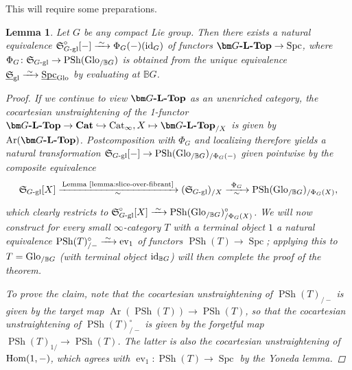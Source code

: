 \documentclass[reqno]{memo-l}
\theoremstyle{mythm}
\newtheorem{lemma}[thm]{Lemma}
\theoremstyle{definition}
\numberwithin{equation}{section}
\newcommand{\gl}{\textup{gl}}
\DeclareMathOperator{\ev}{ev}
\DeclareMathOperator{\Spc}{Spc}
\DeclareMathOperator{\Cat}{Cat}
\renewcommand{\hom}{\textup{hom}}
\DeclareMathOperator{\PSh}{PSh}
\DeclareMathOperator{\Ar}{Ar}
\newcommand{\cat}[1]{\textbf{\textup{#1}}}
\renewcommand{\hom}{{\textup{Hom}}}
\newcommand{\id}{\textup{id}}
\newcommand{\Glo}{\textup{Glo}}
\newcommand{\BGcat}[1]{\mathbb B{#1}}
\newcommand{\ulhelper}[2]{\underline{\setbox0=\hbox{$#1#2$}\dp0=0.4pt \box0\relax}}
\newcommand{\ul}[1]{{\mathpalette\ulhelper{#1}}\hbox{\rule[-2pt]{0pt}{0pt}}}
\newcommand{\iso}{\xrightarrow{\;\smash{\raisebox{-0.25ex}{\ensuremath{\scriptstyle\sim}}}\;}}
\newcommand{\myS}{{{\mathfrak S\kern-.4pt}}}
\begin{document}
This will require some preparations.

\begin{lemma}
    Let $G$ be any compact Lie group. Then there exists a natural equivalence $\myS_\textup{$G$-gl}^{\circ}[-]\iso\Phi_G(-)(\id_G)$ of functors $\cat{$\bm G$-$\cat{L}$-Top}\to\Spc$, where $\Phi_G\colon\myS_\textup{$G$-gl}\to\PSh(\Glo_{/\BGcat{G}})$ is obtained from the unique equivalence $\ul\myS_\gl\iso\ul\Spc_\Glo$ by evaluating at $\BGcat{G}$.
    \begin{proof}
        If we continue to view $\cat{$\bm G$-$\cat{L}$-Top}$ as an \emph{unenriched} category, the cocartesian unstraightening of the 1-functor $\cat{$\bm G$-$\cat{L}$-Top}\to\cat{Cat}\hookrightarrow\Cat_\infty,X\mapsto \cat{$\bm G$-$\cat{L}$-Top}_{/X}$ is given by $\Ar(\cat{$\bm G$-$\cat{L}$-Top})$. Postcomposition with $\Phi_G$ and localizing therefore yields a natural transformation $\myS_\text{$G$-gl}[-]\to\PSh(\Glo_{/\BGcat{G}})_{/\Phi_G(-)}$ given pointwise by the composite equivalence
        \[
            \myS_\text{$G$-gl}[X]\xrightarrow[\raise3.5pt\hbox{$\smash{\scriptstyle\sim}$}]{\,\textup{Lemma~\ref{lemma:slice-over-fibrant}}\,}(\myS_\text{$G$-gl})_{/X}\xrightarrow[\raise3.5pt\hbox{$\smash{\scriptstyle\sim}$}]{\;\,\Phi_G\,\;}\PSh(\Glo_{/\BGcat{G}})_{/\Phi_G(X)},
        \]
        which clearly restricts to $\myS_\text{$G$-gl}^\circ[X]\iso\PSh(\Glo_{/\BGcat{G}})_{/\Phi_G(X)}^\circ$. We will now construct for every small $\infty$-category $T$ with a terminal object $1$ a natural equivalence $\PSh(T)_{/-}^\circ\iso\ev_1$ of functors $\PSh(T)\to\Spc$; applying this to $T=\Glo_{/\BGcat{G}}$ (with terminal object $\id_{\BGcat{G}}$) will then complete the proof of the theorem.
        
        To prove the claim, note that the cocartesian unstraightening of $\PSh(T)_{/-}$ is given by the target map $\Ar(\PSh(T))\to\PSh(T)$, so that the cocartesian unstraightening of $\PSh(T)_{/-}^\circ$ is given by the forgetful map $\PSh(T)_{1/}\to\PSh(T)$. The latter is also the cocartesian unstraightening of $\hom(1,-)$, which agrees with $\ev_1\colon\PSh(T)\to\Spc$ by the Yoneda lemma.
    \end{proof}
\end{lemma}
\end{document}
